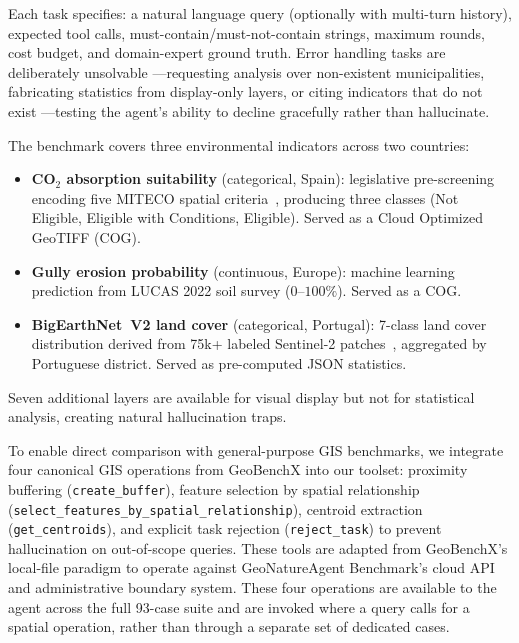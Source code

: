 \documentclass[sigconf]{acmart}
\begin{document}
Each task specifies: a natural language query (optionally with multi-turn history), expected tool calls, must-contain/must-not-contain strings, maximum rounds, cost budget, and domain-expert ground truth. Error handling tasks are deliberately unsolvable ---requesting analysis over non-existent municipalities, fabricating statistics from display-only layers, or citing indicators that do not exist ---testing the agent's ability to decline gracefully rather than hallucinate.

The benchmark covers three environmental indicators across two countries:

\begin{itemize}
    \item \textbf{CO$_2$ absorption suitability} (categorical, Spain): legislative pre-screening encoding five MITECO spatial criteria~\citep{spain2025rd214}, producing three classes (Not Eligible, Eligible with Conditions, Eligible). Served as a Cloud Optimized GeoTIFF (COG).
    \item \textbf{Gully erosion probability} (continuous, Europe): machine learning prediction from LUCAS 2022 soil survey ($0$--$100\%$). Served as a COG.
    \item \textbf{BigEarthNet~V2 land cover} (categorical, Portugal): 7-class land cover distribution derived from 75k+ labeled Sentinel-2 patches~\citep{clasen2024reben}, aggregated by Portuguese district. Served as pre-computed JSON statistics.
\end{itemize}

Seven additional layers are available for visual display but not for statistical analysis, creating natural hallucination traps.

To enable direct comparison with general-purpose GIS benchmarks, we integrate four canonical GIS operations from GeoBenchX \citep{krechetova2025geobenchx} into our toolset: proximity buffering (\texttt{create\_buffer}), feature selection by spatial relationship (\texttt{select\_\allowbreak features\_\allowbreak by\_\allowbreak spatial\_\allowbreak relationship}), centroid extraction (\texttt{get\_centroids}), and explicit task rejection (\texttt{reject\_task}) to prevent hallucination on out-of-scope queries. These tools are adapted from GeoBenchX's local-file paradigm to operate against GeoNatureAgent Benchmark's cloud API and administrative boundary system. These four operations are available to the agent across the full 93-case suite and are invoked where a query calls for a spatial operation, rather than through a separate set of dedicated cases.
\end{document}

